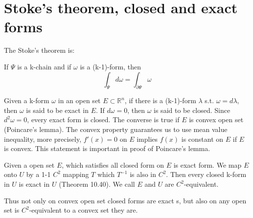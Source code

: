\section{Stoke's theorem, closed and exact forms}
The Stoke's theorem is:
\begin{theorem}
    If $\Psi$ is a k-chain and if $\omega$ is a (k-1)-form, then
    \begin{equation*}
        \int_{\Psi}{d\omega}=\int_{\partial\Psi}{\omega}
    \end{equation*}
\end{theorem}
Given a k-form $\omega$ in an open set $E\subset \mathbb{R}^n$, if there is a (k-1)-form $\lambda$ s.t. $\omega=d\lambda$, then $\omega$ is said to be exact in $E$. If $d\omega=0$, then $\omega$ is said to be closed. Since $d^2\omega=0$, every exact form is closed. The converse is true if $E$ is convex open set (Poincare's lemma). The convex property guarantees us to use mean value inequality, more precisely, $f'(x)=0$ on $E$ implies $f(x)$ is constant on $E$ if $E$ is convex. This statement is important in proof of Poincare's lemma.\par
Given a open set $E$, which satisfies all closed form on $E$ is exact form. We map $E$ onto $U$ by a 1-1 $C^2$ mapping $T$ which $T^{-1}$ is also in $C^2$. Then every closed k-form in $U$ is exact in $U$ (Theorem 10.40). We call $E$ and $U$ are $C^2$-equivalent.\par
Thus not only on convex open set closed forms are exact s, but also on any open set is $C^2$-equivalent to a convex set they are.\par 
